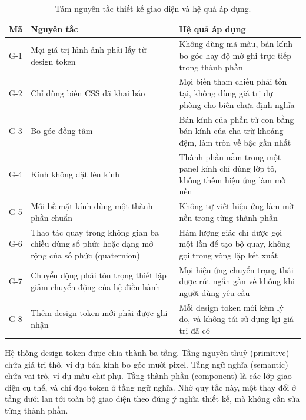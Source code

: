 \begin{table}[htbp]
    \centering
    \caption{Tám nguyên tắc thiết kế giao diện và hệ quả áp dụng.}
    \label{tab:tam-nguyen-tac-ui}
    \small
    \begin{tabularx}{\textwidth}{@{}l>{\raggedright\arraybackslash}p{4.2cm}>{\raggedright\arraybackslash}X@{}}
        \toprule
        \textbf{Mã} & \textbf{Nguyên tắc} & \textbf{Hệ quả áp dụng} \\
        \midrule
        G-1 & Mọi giá trị hình ảnh phải lấy từ design token & Không dùng mã màu, bán kính bo góc hay độ mờ ghi trực tiếp trong thành phần \\
        G-2 & Chỉ dùng biến CSS đã khai báo & Mọi biến tham chiếu phải tồn tại, không dùng giá trị dự phòng cho biến chưa định nghĩa \\
        G-3 & Bo góc đồng tâm & Bán kính của phần tử con bằng bán kính của cha trừ khoảng đệm, làm tròn về bậc gần nhất \\
        G-4 & Kính không đặt lên kính & Thành phần nằm trong một panel kính chỉ dùng lớp tô, không thêm hiệu ứng làm mờ nền \\
        G-5 & Mỗi bề mặt kính dùng một thành phần chuẩn & Không tự viết hiệu ứng làm mờ nền trong từng thành phần \\
        G-6 & Thao tác quay trong không gian ba chiều dùng số phức hoặc dạng mở rộng của số phức (quaternion) & Hàm lượng giác chỉ được gọi một lần để tạo bộ quay, không gọi trong vòng lặp kết xuất \\
        G-7 & Chuyển động phải tôn trọng thiết lập giảm chuyển động của hệ điều hành & Mọi hiệu ứng chuyển trạng thái được rút ngắn gần về không khi người dùng yêu cầu \\
        G-8 & Thêm design token mới phải được ghi nhận & Mỗi design token mới kèm lý do, và không tái sử dụng lại giá trị đã có \\
        \bottomrule
    \end{tabularx}
\end{table}

Hệ thống design token được chia thành ba tầng. Tầng nguyên thuỷ (primitive) chứa giá trị thô, ví dụ bán kính bo góc mười pixel. Tầng ngữ nghĩa (semantic) chứa vai trò, ví dụ màu chữ phụ. Tầng thành phần (component) là các lớp giao diện cụ thể, và chỉ đọc token ở tầng ngữ nghĩa. Nhờ quy tắc này, một thay đổi ở tầng dưới lan tới toàn bộ giao diện theo đúng ý nghĩa thiết kế, mà không cần sửa từng thành phần.

